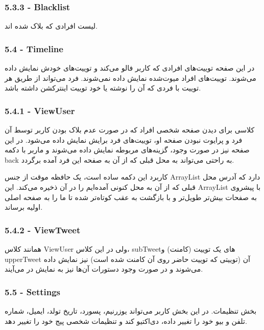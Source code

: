 \documentclass[12pt]{article}
\begin{document}
\LTR
\begin{latin}
\subsubsection*{5.3.3 - Blacklist}
\end{latin}
\RTL
لیست افرادی که بلاک شده اند.

\LTR
\begin{latin}
\subsubsection*{5.4 - Timeline}
\end{latin}
\RTL
در این صفحه توییت‌های افرادی که کاربر فالو می‌کند و توییت‌های خودش نمایش داده می‌شوند. توییت‌های افراد میوت‌شده نمایش داده نمی‌شوند. فرد می‌تواند از طریق هر توییت با فردی که آن را نوشته یا خود توییت اینترکشن داشته باشد.

\LTR
\begin{latin}
\subsubsection*{5.4.1 - ViewUser}
\end{latin}
\RTL
کلاسی برای دیدن صفحه شخصی افراد که در صورت عدم بلاک بودن کاربر توسط آن فرد و پرایوت نبودن صفحه او، توییت‌های فرد برایش نمایش داده می‌شود. در این صفحه نیز در صورت وجود، گزینه‌های مربوطه نمایش داده می‌شوند و ماربر با دکمه back به راحتی می‌تواند به محل قبلی که از آن به صفحه این فرد آمده برگردد.

کاربرد این دکمه ساده است، یک حافظه موقت از جنس ArrayList دارد که آدرس محل قبلی که از آن به محل کنونی آمده‌ایم را در آن ذخیره می‌کند. این ArrayList با پیشروی به صفحات بیش‌تر طویل‌تر و با بازگشت به عقب کوتاه‌تر شده تا ما را به صفحه اصلی اولیه برساند.

\LTR
\begin{latin}
\subsubsection*{5.4.2 - ViewTweet}
\end{latin}
\RTL
همانند کلاس ViewUser ولی در این کلاس، subTweetهای یک توییت (کامنت) و upperTweet آن (توییتی که توییت حاضر روی آن کامنت شده است) نیز نمایش داده می‌شوند و در صورت وجود دستورات آن‌ها نیز به نمایش در می‌آیند.

\LTR
\begin{latin}
\subsubsection*{5.5 - Settings}
\end{latin}
\RTL
بخش تنظیمات. در این بخش کاربر می‌تواند یوزرنیم‌، پسورد‌، تاریخ تولد‌، ایمیل، شماره تلفن و بیو خود را تغییر داده، دی‌اکتیو کند و تنظیمات شخصی پیج خود را تغییر دهد.
\end{document}
